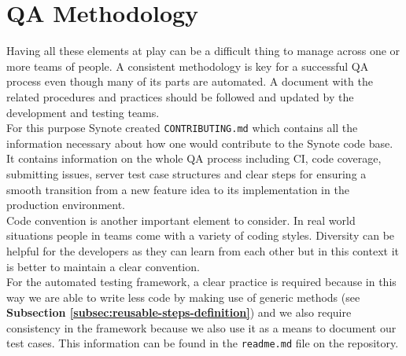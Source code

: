 \section{QA Methodology}
\label{sec:qa-methodology}

Having all these elements at play can be a difficult thing to manage across one or more teams of people. A consistent methodology is key for a successful QA process even though many of its parts are automated. A document with the related procedures and practices should be followed and updated by the development and testing teams.
\\

For this purpose Synote created \texttt{CONTRIBUTING.md} which contains all the information necessary about how one would contribute to the Synote code base. It contains information on the whole QA process including CI, code coverage, submitting issues, server test case structures and clear steps for ensuring a smooth transition from a new feature idea to its implementation in the production environment.
\\

Code convention is another important element to consider. In real world situations people in teams come with a variety of coding styles. Diversity can be helpful for the developers as they can learn from each other but in this context it is better to maintain a clear convention.
\\

For the automated testing framework, a clear practice is required because in this way we are able to write less code by making use of generic methods (see \textbf{Subsection \ref{subsec:reusable-steps-definition}}) and we also require consistency in the framework because we also use it as a means to document our test cases. This information can be found in the \texttt{readme.md} file on the repository.
\\
